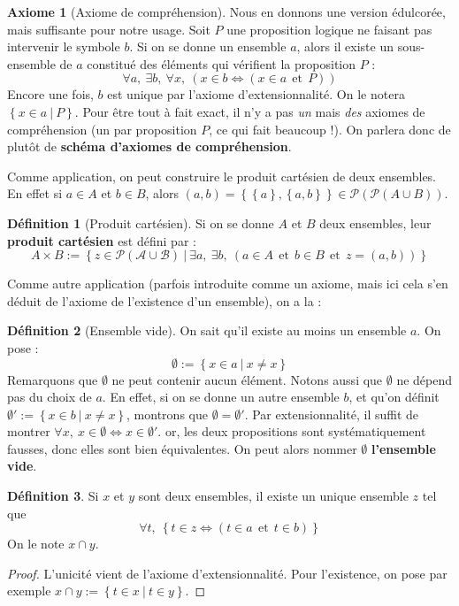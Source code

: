 \documentclass[french]{book}
\theoremstyle{plain}
\theoremstyle{definition}
\newtheorem{dfn}{Définition}[chapter]
\newtheorem{ax}{Axiome}[chapter]
\theoremstyle{remark}
\begin{document}
\begin{ax}[Axiome de compréhension]
	Nous en donnons une version édulcorée, mais suffisante pour notre usage. Soit $P$ une proposition logique ne faisant pas intervenir le symbole $b$. Si on se donne un ensemble $a$, alors il existe un sous-ensemble de $a$ constitué des éléments qui vérifient la proposition $P$ : $$\forall a,\ \exists b,\ \forall x,\ \left(x\in b\iff \left(x\in a \ \ \text{et}\ \ P\right)\right)$$ Encore une fois, $b$ est unique par l'axiome d'extensionnalité. On le notera $\left\{x\in a\ | \ P\right\}$. Pour être tout à fait exact, il n'y a pas \textit{un} mais \textit{des} axiomes de compréhension (un par proposition $P$, ce qui fait beaucoup !). On parlera donc de plutôt de \textbf{schéma d'axiomes de compréhension}.
\end{ax}
Comme application, on peut construire le produit cartésien de deux ensembles. En effet si $a\in A$ et $b\in B$, alors $(a,b)=\left\{\left\{a\right\},\left\{a,b\right\}\right\}\in\mathcal{P}(\mathcal{P}(A\cup B))$.
\begin{dfn}[Produit cartésien]
	Si on se donne $A$ et $B$ deux ensembles, leur \textbf{produit cartésien} est défini par : $$A\times B:=\left\{z\in\mathcal{\mathcal{P}(A\cup B)}\ | \ \exists a,\ \exists b,\ \left(a\in A \ \ \text{et}\ \ b\in B\ \ \text{et}\ \ z=(a,b)\right)\right\}$$
\end{dfn}
Comme autre application (parfois introduite comme un axiome, mais ici cela s'en déduit de l'axiome de l'existence d'un ensemble), on a la :
\begin{dfn}[Ensemble vide]
	On sait qu'il existe au moins un ensemble $a$. On pose : $$\emptyset:=\left\{x\in a\ | \ x\ne x\right\}$$ Remarquons que $\emptyset$ ne peut contenir aucun élément. Notons aussi que $\emptyset$ ne dépend pas du choix de $a$. En effet, si on se donne un autre ensemble $b$, et qu'on définit $\emptyset':=\left\{x\in b\ | \ x\ne x\right\}$, montrons que $\emptyset=\emptyset'$. Par extensionnalité, il suffit de montrer $\forall x,\ x\in\emptyset\iff x\in\emptyset'$. or, les deux propositions sont systématiquement fausses, donc elles sont bien équivalentes. On peut alors nommer $\emptyset$ \textbf{l'ensemble vide}.
\end{dfn}
\begin{dfn}
	Si $x$ et $y$ sont deux ensembles, il existe un unique ensemble $z$ tel que $$\forall t,\ \left\{t\in z\iff\left(t\in a\ \ \text{et}\ \ t\in b\right)\right\}$$ On le note $x\cap y$.
\end{dfn}
\begin{proof}
	L'unicité vient de l'axiome d'extensionnalité. Pour l'existence, on pose par exemple $x\cap y:=\left\{t\in x\ | \ t\in y\right\}$.
\end{proof}
\end{document}
